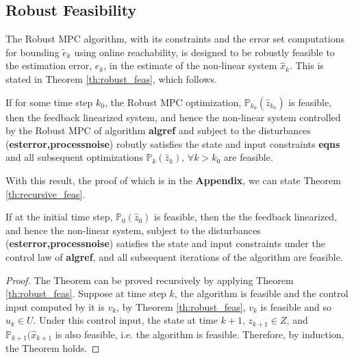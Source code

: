 \subsection{Robust Feasibility}

The Robust MPC algorithm, with its constraints and the error set computations for bounding $\tilde{e}_k$ using online reachability, is designed to be robustly feasible to the estimation error, $e_k$, in the estimate of the non-linear system $\hat{x}_k$. This is stated in Theorem \ref{th:robust_feas}, which follows.

\begin{theorem}
\label{th:robust_feas}
If for some time step $k_0$, the Robust MPC optimization, $\mathbb{P}_{k_0}(\hat{z}_{k_0})$ is feasible, then the feedback linearized system, and hence the non-linear system controlled by the Robust MPC of algorithm \textbf{algref} and subject to the disturbances (\textbf{esterror,processnoise}) robutly satisfies the state and input constraints \textbf{eqns} and all subsequent optimizations $\mathbb{P}_{k}(\hat{z}_{k}), \, \forall k>k_0$ are feasible.
\end{theorem}

With this result, the proof of which is in the \textbf{Appendix}, we can state Theorem \ref{th:recursive_feas}.

\begin{theorem}
\label{th:recursive_feas}
If at the initial time step, $\mathbb{P}_0(\hat{z}_0)$ is feasible, then the the feedback linearized, and hence the non-linear system, subject to the disturbances  (\textbf{esterror,processnoise}) satisfies the state and input constraints under the control law of \textbf{algref}, and all subsequent iterations of the algorithm are feasible.
\end{theorem}

\begin{proof}
The Theorem can be proved recursively by applying Theorem \ref{th:robust_feas}. Suppose at time step $k$, the algorithm is feasible and the control input computed by it is $v_k$, by Theorem \ref{th:robust_feas}, $v_k$ is feasible and so $u_k \in U$. Under this control input, the state at time $k+1$, $z_{k+1} \in Z$, and $\mathbb{P}_{k+1}(\hat{x}_{k+1}$ is also feasible, i.e. the algorithm is feasible. Therefore, by induction, the Theorem holds. 
\end{proof}